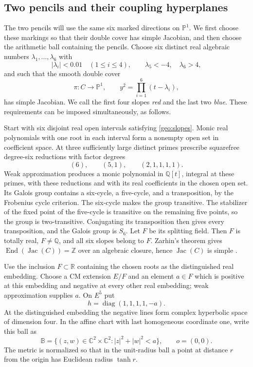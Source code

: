 \documentclass[11pt,reqno]{amsart}
\numberwithin{equation}{section}
\theoremstyle{definition}
\theoremstyle{remark}
\begin{document}
\subsection{Two pencils and their coupling hyperplanes}\label{geo:prototype}

The two pencils will use the same six marked directions on $\mathbb P^1$.
We first choose these markings so that their double cover has simple
Jacobian, and then choose the arithmetic ball containing the pencils.
Choose six distinct real algebraic numbers $\lambda_1,\ldots,\lambda_6$ with
\begin{equation}\label{geo:slopes}
 |\lambda_i|<0.01\quad(1\le i\le4),
 \qquad \lambda_5<-4,\quad \lambda_6>4,
\end{equation}
and such that the smooth double cover
\begin{equation}\label{geo:curve}
 \pi:C\longrightarrow\mathbb P^1,
 \qquad y^2=\prod_{i=1}^6(t-\lambda_i),
\end{equation}
has simple Jacobian.  We call the first four slopes \emph{red} and the
last two \emph{blue}.  These requirements can be imposed simultaneously,
as follows.

Start with six disjoint real open intervals satisfying
\eqref{geo:slopes}.  Monic real polynomials with one root in each interval
form a nonempty open set in coefficient space.  At three sufficiently
large distinct primes prescribe squarefree degree-six reductions with
factor degrees
\[
 (6),\qquad(5,1),\qquad(2,1,1,1,1).
\]
Weak approximation produces a monic polynomial in $\mathbb Q[t]$, integral at
these primes, with these reductions and with its real coefficients in
the chosen open set.  Its Galois group contains a six-cycle, a five-cycle,
and a transposition, by the Frobenius cycle criterion.  The six-cycle
makes the group transitive.  The stabilizer of the fixed point of the
five-cycle is transitive on the remaining five points, so the group is
two-transitive.  Conjugating its transposition then gives every
transposition, and the Galois group is $S_6$.  Let $F$ be its splitting
field.  Then $F$ is totally real, $F\ne\mathbb Q$, and all six slopes belong
to $F$.  Zarhin's theorem gives
$\operatorname{End}(\operatorname{Jac}(C))=\mathbb Z$ over an algebraic closure, hence $\operatorname{Jac}(C)$ is simple
\cite[Theorem~2.1]{Zarhin}.

Use the inclusion $F\subset\mathbb R$ containing the chosen roots as the
distinguished real embedding.  Choose a CM extension $E/F$ and an
element $a\in F$ which is positive at this embedding and negative at
every other real embedding; weak approximation supplies $a$.  On $E^5$ put
\begin{equation}\label{geo:hermitian}
 h=\operatorname{diag}(1,1,1,1,-a).
\end{equation}
At the distinguished embedding the negative lines form complex
hyperbolic space of dimension four.  In the affine chart with last
homogeneous coordinate one, write this ball as
\[
 \mathbb B=\{(z,w)\in\mathbb C^2\times\mathbb C^2:|z|^2+|w|^2<a\},
 \qquad o=(0,0).
\]
The metric is normalized so that in the unit-radius ball a point at
distance $r$ from the origin has Euclidean radius $\tanh r$.
\end{document}
